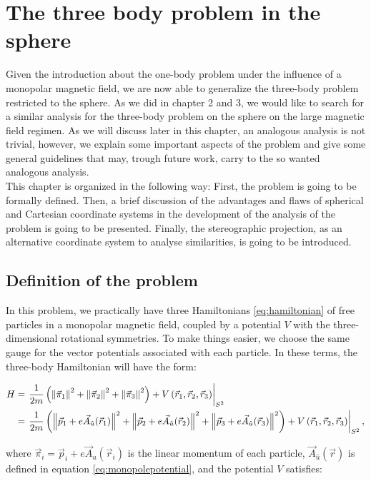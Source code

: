 \chapter{The three body problem in the sphere}
Given the introduction about the one-body problem under the influence of a monopolar magnetic field, we are now able to generalize the three-body problem restricted to the sphere. As we did in chapter 2 and 3, we would like to search for a similar analysis for the three-body problem on the sphere on the large magnetic field regimen. As we will discuss later in this chapter, an analogous analysis is not trivial, however, we explain some important aspects of the problem and give some general guidelines that may, trough future work, carry to the so wanted analogous analysis.\\

This chapter is organized in the following way: First, the problem is going to be formally defined. Then, a brief discussion of the advantages and flaws of spherical and Cartesian coordinate systems in the development of the analysis of the problem is going to be presented. Finally, the stereographic projection, as an alternative coordinate system to analyse similarities, is going to be introduced.\\

\section{Definition of the problem}
In this problem, we practically have three Hamiltonians \eqref{eq:hamiltonian} of free particles in a monopolar magnetic field, coupled by a potential $V$ with the three-dimensional rotational symmetries. To make things easier, we choose the same gauge for the vector potentials associated with each particle. In these terms, the three-body Hamiltonian will have the form:

\begin{align}
H &= \left. \frac{1}{2m}\left( \left\lVert \vec{\pi}_1 \right\rVert^2+\left\lVert \vec{\pi}_2 \right\rVert^2+\left\lVert \vec{\pi}_3 \right\rVert^2 \right) + V\left( \vec{r}_1,\vec{r}_2,\vec{r}_3 \right)    \right|_{S^2} \nonumber \\
&= \left. \frac{1}{2m}\left( \left\lVert \vec{p}_1+e\vec{A}_{\hat{u}}(\vec{r}_1) \right\rVert^2+\left\lVert \vec{p}_2+e\vec{A}_{\hat{u}}(\vec{r}_2) \right\rVert^2+\left\lVert \vec{p}_3+e\vec{A}_{\hat{u}}(\vec{r}_3) \right\rVert^2 \right) + V\left( \vec{r}_1,\vec{r}_2,\vec{r}_3 \right)    \right|_{S^2},
\label{eq:3sphereHam}
\end{align}

where $\vec{\pi}_i = \vec{p}_i+e\vec{A}_{\hat{u}}(\vec{r}_i)$ is the linear momentum of each particle,  $\vec{A}_{\hat{u}}(\vec{r})$ is defined in equation \eqref{eq:monopolepotential}, and the potential $V$ satisfies:

